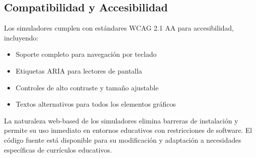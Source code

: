 \subsection{Compatibilidad y Accesibilidad}

Los simuladores cumplen con estándares WCAG 2.1 AA para accesibilidad, incluyendo:

\begin{itemize}
    \item Soporte completo para navegación por teclado
    \item Etiquetas ARIA para lectores de pantalla
    \item Controles de alto contraste y tamaño ajustable
    \item Textos alternativos para todos los elementos gráficos
\end{itemize}

La naturaleza web-based de los simuladores elimina barreras de instalación y permite su uso inmediato en entornos educativos con restricciones de software. El código fuente está disponible para su modificación y adaptación a necesidades específicas de currículos educativos.